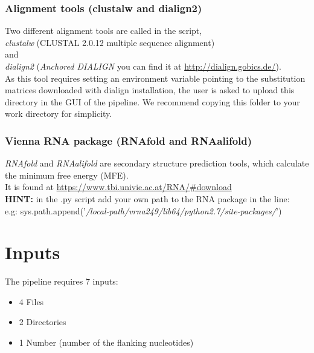 \documentclass[a4paper,20pt]{report}
\begin{document}
  

\subsection{Alignment tools (clustalw and dialign2)}
\noindent
Two different alignment tools are called in the script,\\
\textit{clustalw} (CLUSTAL 2.0.12 multiple sequence alignment)\\
and\\
\textit{dialign2} (\textit{Anchored DIALIGN} you can find it at \href{http://dialign.gobics.de/}{http://dialign.gobics.de/}).\\ 
As  this tool requires setting 
an environment variable pointing to the substitution matrices downloaded with dialign installation, the user is asked to
upload this directory in the GUI of the pipeline. We recommend copying this folder to your work directory for simplicity.
\subsection{Vienna RNA package (RNAfold and RNAalifold)}
\noindent
\textit{RNAfold} and \textit{RNAalifold} are secondary structure prediction tools, which calculate the minimum free energy
(MFE).\\
It is found at \href{https://www.tbi.univie.ac.at/RNA/\#download}{ https://www.tbi.univie.ac.at/RNA/\#download}\\
\textbf{HINT:} in the .py script add your own path to the RNA package in the line:\\
e.g: sys.path.append('\textit{/local-path/vrna249/lib64/python2.7/site-packages/}')

\chapter*{Inputs}
\label{chap:inputs}
The pipeline requires 7 inputs:
  \begin{itemize}
   \item 4 Files
   \item 2 Directories
   \item 1 Number (number of the flanking nucleotides)
  \end{itemize}
\end{document}
